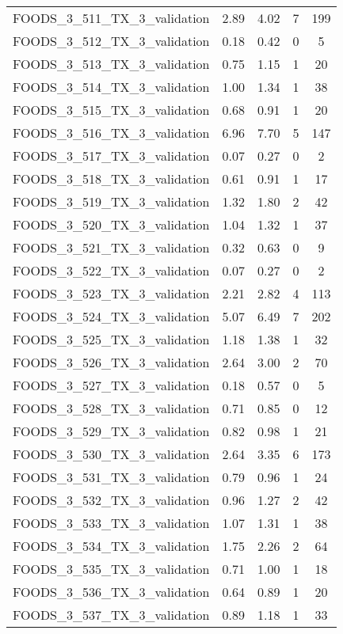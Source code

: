 \begin{table}
\begin{tabular}{|l|c|c|c|c|}
FOODS\_3\_511\_TX\_3\_validation & 2.89 & 4.02 & 7 & 199 \\
FOODS\_3\_512\_TX\_3\_validation & 0.18 & 0.42 & 0 & 5 \\
FOODS\_3\_513\_TX\_3\_validation & 0.75 & 1.15 & 1 & 20 \\
FOODS\_3\_514\_TX\_3\_validation & 1.00 & 1.34 & 1 & 38 \\
FOODS\_3\_515\_TX\_3\_validation & 0.68 & 0.91 & 1 & 20 \\
FOODS\_3\_516\_TX\_3\_validation & 6.96 & 7.70 & 5 & 147 \\
FOODS\_3\_517\_TX\_3\_validation & 0.07 & 0.27 & 0 & 2 \\
FOODS\_3\_518\_TX\_3\_validation & 0.61 & 0.91 & 1 & 17 \\
FOODS\_3\_519\_TX\_3\_validation & 1.32 & 1.80 & 2 & 42 \\
FOODS\_3\_520\_TX\_3\_validation & 1.04 & 1.32 & 1 & 37 \\
FOODS\_3\_521\_TX\_3\_validation & 0.32 & 0.63 & 0 & 9 \\
FOODS\_3\_522\_TX\_3\_validation & 0.07 & 0.27 & 0 & 2 \\
FOODS\_3\_523\_TX\_3\_validation & 2.21 & 2.82 & 4 & 113 \\
FOODS\_3\_524\_TX\_3\_validation & 5.07 & 6.49 & 7 & 202 \\
FOODS\_3\_525\_TX\_3\_validation & 1.18 & 1.38 & 1 & 32 \\
FOODS\_3\_526\_TX\_3\_validation & 2.64 & 3.00 & 2 & 70 \\
FOODS\_3\_527\_TX\_3\_validation & 0.18 & 0.57 & 0 & 5 \\
FOODS\_3\_528\_TX\_3\_validation & 0.71 & 0.85 & 0 & 12 \\
FOODS\_3\_529\_TX\_3\_validation & 0.82 & 0.98 & 1 & 21 \\
FOODS\_3\_530\_TX\_3\_validation & 2.64 & 3.35 & 6 & 173 \\
FOODS\_3\_531\_TX\_3\_validation & 0.79 & 0.96 & 1 & 24 \\
FOODS\_3\_532\_TX\_3\_validation & 0.96 & 1.27 & 2 & 42 \\
FOODS\_3\_533\_TX\_3\_validation & 1.07 & 1.31 & 1 & 38 \\
FOODS\_3\_534\_TX\_3\_validation & 1.75 & 2.26 & 2 & 64 \\
FOODS\_3\_535\_TX\_3\_validation & 0.71 & 1.00 & 1 & 18 \\
FOODS\_3\_536\_TX\_3\_validation & 0.64 & 0.89 & 1 & 20 \\
FOODS\_3\_537\_TX\_3\_validation & 0.89 & 1.18 & 1 & 33 \\

\end{tabular}
\end{table}
